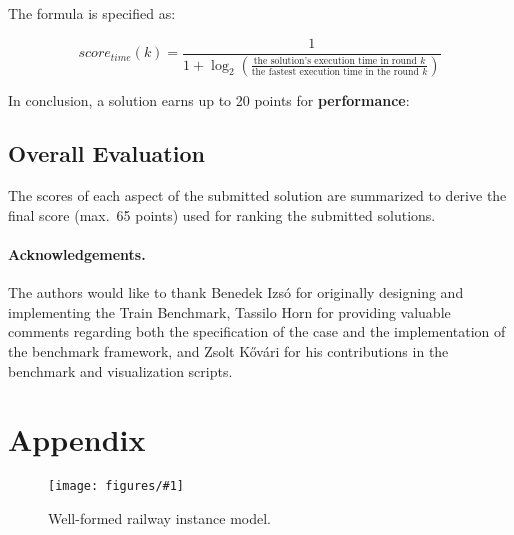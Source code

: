 \documentclass[submission,copyright,creativecommons]{eptcs}
\newcommand{\tb}{Train Benchmark\xspace}
\newcommand{\ttcfig}[2]{
\begin{figure}[htb] 
	\centering
	\texttt{[image: figures/\#1]}
	\caption{#2.}
	\label{fig:#1}
\end{figure}}
\begin{document}
\begin{itemize}
  	The formula is specified as:
  
    \[ \mathit{score}_\mathit{time}(k)=\frac{1}{1+\log_2\left(\frac{\text{the solution's execution time in round $k$}}{\text{the fastest execution time in the round $k$}}\right)} \]
\end{itemize}

In conclusion, a solution earns up to 20 points for \textbf{performance}:

\noindent{}

\subsection{Overall Evaluation}

The scores of each aspect of the submitted solution are summarized to derive the final score (max.\ 65 points) used for ranking the submitted solutions.

\paragraph{Acknowledgements.} The authors would like to thank Benedek Izsó for originally designing and implementing the \tb, Tassilo Horn for providing valuable comments regarding both the specification of the case and the implementation of the benchmark framework, and Zsolt Kővári for his contributions in the benchmark and visualization scripts.




\clearpage

\appendix
\section{Appendix}

\ttcfig{railway-yed}{Well-formed railway instance model}
\end{document}
